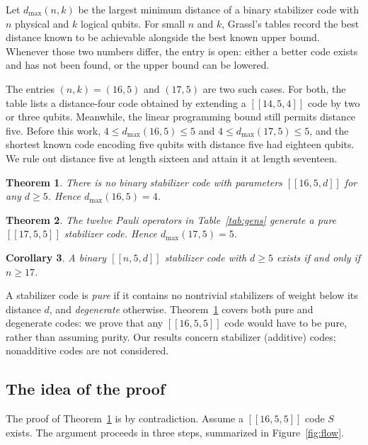 \documentclass[11pt]{article}
\newtheorem{theorem}{Theorem}[section]
\newtheorem{corollary}[theorem]{Corollary}
\theoremstyle{definition}
\theoremstyle{remark}
\newcommand{\qc}[1]{[\![#1]\!]}
\begin{document}
Let \(d_{\max}(n,k)\) be the largest minimum distance of a binary
stabilizer code with \(n\) physical and \(k\) logical qubits. For small
\(n\) and \(k\), Grassl's tables \cite{grassl} record the best distance
known to be achievable alongside the best known upper bound. Whenever
those two numbers differ, the entry is open: either a better code exists
and has not been found, or the upper bound can be lowered.

The entries \((n,k)=(16,5)\) and \((17,5)\) are two such cases. For
both, the table lists a distance-four code obtained by extending a
\(\qc{14,5,4}\) code by two or three qubits. Meanwhile, the linear
programming bound \cite{shorlaflamme,rains98,ashikhmin,rains} still
permits distance five. Before this work,
\(4\leq d_{\max}(16,5)\leq5\) and \(4\leq d_{\max}(17,5)\leq5\), and the
shortest known code encoding five qubits with distance five had
eighteen qubits. We rule out distance five at length sixteen and attain
it at length seventeen.

\begin{theorem}\label{thm:main}
There is no binary stabilizer code with parameters \(\qc{16,5,d}\) for
any \(d\geq5\). Hence \(d_{\max}(16,5)=4\).
\end{theorem}

\begin{theorem}\label{thm:code}
The twelve Pauli operators in Table~\ref{tab:gens} generate a pure
\(\qc{17,5,5}\) stabilizer code. Hence \(d_{\max}(17,5)=5\).
\end{theorem}

\begin{corollary}\label{cor:length}
A binary \(\qc{n,5,d}\) stabilizer code with \(d\geq5\) exists if and
only if \(n\geq17\).
\end{corollary}

A stabilizer code is \emph{pure} if it contains no nontrivial
stabilizers of weight below its distance \(d\), and \emph{degenerate}
otherwise. Theorem~\ref{thm:main} covers both pure and degenerate codes:
we prove that any \(\qc{16,5,5}\) code would have to be pure, rather
than assuming purity. Our results concern stabilizer (additive) codes;
nonadditive codes are not considered.

\subsection*{The idea of the proof}

The proof of Theorem~\ref{thm:main} is by contradiction. Assume a
\(\qc{16,5,5}\) code \(S\) exists. The argument proceeds in three steps,
summarized in Figure~\ref{fig:flow}.
\end{document}
